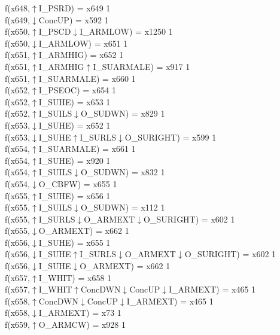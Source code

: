 f(x648,$\uparrow$I\_PSRD) = x649 {1} \\
f(x649,$\downarrow$ConcUP) = x592 {1} \\
f(x650,$\uparrow$I\_PSCD$\downarrow$I\_ARMLOW) = x1250 {1} \\
f(x650,$\downarrow$I\_ARMLOW) = x651 {1} \\
f(x651,$\uparrow$I\_ARMHIG) = x652 {1} \\
f(x651,$\uparrow$I\_ARMHIG$\uparrow$I\_SUARMALE) = x917 {1} \\
f(x651,$\uparrow$I\_SUARMALE) = x660 {1} \\
f(x652,$\uparrow$I\_PSEOC) = x654 {1} \\
f(x652,$\uparrow$I\_SUHE) = x653 {1} \\
f(x652,$\uparrow$I\_SUILS$\downarrow$O\_SUDWN) = x829 {1} \\
f(x653,$\downarrow$I\_SUHE) = x652 {1} \\
f(x653,$\downarrow$I\_SUHE$\uparrow$I\_SURLS$\downarrow$O\_SURIGHT) = x599 {1} \\
f(x654,$\uparrow$I\_SUARMALE) = x661 {1} \\
f(x654,$\uparrow$I\_SUHE) = x920 {1} \\
f(x654,$\uparrow$I\_SUILS$\downarrow$O\_SUDWN) = x832 {1} \\
f(x654,$\downarrow$O\_CBFW) = x655 {1} \\
f(x655,$\uparrow$I\_SUHE) = x656 {1} \\
f(x655,$\uparrow$I\_SUILS$\downarrow$O\_SUDWN) = x112 {1} \\
f(x655,$\uparrow$I\_SURLS$\downarrow$O\_ARMEXT$\downarrow$O\_SURIGHT) = x602 {1} \\
f(x655,$\downarrow$O\_ARMEXT) = x662 {1} \\
f(x656,$\downarrow$I\_SUHE) = x655 {1} \\
f(x656,$\downarrow$I\_SUHE$\uparrow$I\_SURLS$\downarrow$O\_ARMEXT$\downarrow$O\_SURIGHT) = x602 {1} \\
f(x656,$\downarrow$I\_SUHE$\downarrow$O\_ARMEXT) = x662 {1} \\
f(x657,$\uparrow$I\_WHIT) = x658 {1} \\
f(x657,$\uparrow$I\_WHIT$\uparrow$ConcDWN$\downarrow$ConcUP$\downarrow$I\_ARMEXT) = x465 {1} \\
f(x658,$\uparrow$ConcDWN$\downarrow$ConcUP$\downarrow$I\_ARMEXT) = x465 {1} \\
f(x658,$\downarrow$I\_ARMEXT) = x73 {1} \\
f(x659,$\uparrow$O\_ARMCW) = x928 {1} \\
